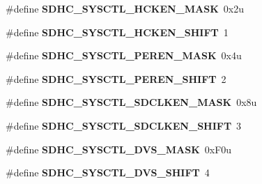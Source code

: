 \begin{DoxyCompactItemize}
\item 
\#define {\bfseries S\+D\+H\+C\+\_\+\+S\+Y\+S\+C\+T\+L\+\_\+\+H\+C\+K\+E\+N\+\_\+\+M\+A\+SK}~0x2u\hypertarget{group__SDHC__Register__Masks_gaefb48b61c548dd73ba8ae645d6e0c889}{}\label{group__SDHC__Register__Masks_gaefb48b61c548dd73ba8ae645d6e0c889}

\item 
\#define {\bfseries S\+D\+H\+C\+\_\+\+S\+Y\+S\+C\+T\+L\+\_\+\+H\+C\+K\+E\+N\+\_\+\+S\+H\+I\+FT}~1\hypertarget{group__SDHC__Register__Masks_gab4bc40b459bbe0c405262109e6765e69}{}\label{group__SDHC__Register__Masks_gab4bc40b459bbe0c405262109e6765e69}

\item 
\#define {\bfseries S\+D\+H\+C\+\_\+\+S\+Y\+S\+C\+T\+L\+\_\+\+P\+E\+R\+E\+N\+\_\+\+M\+A\+SK}~0x4u\hypertarget{group__SDHC__Register__Masks_ga23b3d2c76db562da51b824fa435f306c}{}\label{group__SDHC__Register__Masks_ga23b3d2c76db562da51b824fa435f306c}

\item 
\#define {\bfseries S\+D\+H\+C\+\_\+\+S\+Y\+S\+C\+T\+L\+\_\+\+P\+E\+R\+E\+N\+\_\+\+S\+H\+I\+FT}~2\hypertarget{group__SDHC__Register__Masks_ga28db53e7da45cb7a0ed9de6c7bac7a85}{}\label{group__SDHC__Register__Masks_ga28db53e7da45cb7a0ed9de6c7bac7a85}

\item 
\#define {\bfseries S\+D\+H\+C\+\_\+\+S\+Y\+S\+C\+T\+L\+\_\+\+S\+D\+C\+L\+K\+E\+N\+\_\+\+M\+A\+SK}~0x8u\hypertarget{group__SDHC__Register__Masks_ga19de408b244a32169fec30115c0b8a4a}{}\label{group__SDHC__Register__Masks_ga19de408b244a32169fec30115c0b8a4a}

\item 
\#define {\bfseries S\+D\+H\+C\+\_\+\+S\+Y\+S\+C\+T\+L\+\_\+\+S\+D\+C\+L\+K\+E\+N\+\_\+\+S\+H\+I\+FT}~3\hypertarget{group__SDHC__Register__Masks_ga4dbc0c5f5a10fdd6b7fb6642f10548df}{}\label{group__SDHC__Register__Masks_ga4dbc0c5f5a10fdd6b7fb6642f10548df}

\item 
\#define {\bfseries S\+D\+H\+C\+\_\+\+S\+Y\+S\+C\+T\+L\+\_\+\+D\+V\+S\+\_\+\+M\+A\+SK}~0x\+F0u\hypertarget{group__SDHC__Register__Masks_ga8311f017ab13388163976f2e422d072d}{}\label{group__SDHC__Register__Masks_ga8311f017ab13388163976f2e422d072d}

\item 
\#define {\bfseries S\+D\+H\+C\+\_\+\+S\+Y\+S\+C\+T\+L\+\_\+\+D\+V\+S\+\_\+\+S\+H\+I\+FT}~4\hypertarget{group__SDHC__Register__Masks_gafc17e8d8673044839bfc65d01ea0bc0b}{}\label{group__SDHC__Register__Masks_gafc17e8d8673044839bfc65d01ea0bc0b}


\end{DoxyCompactItemize}
